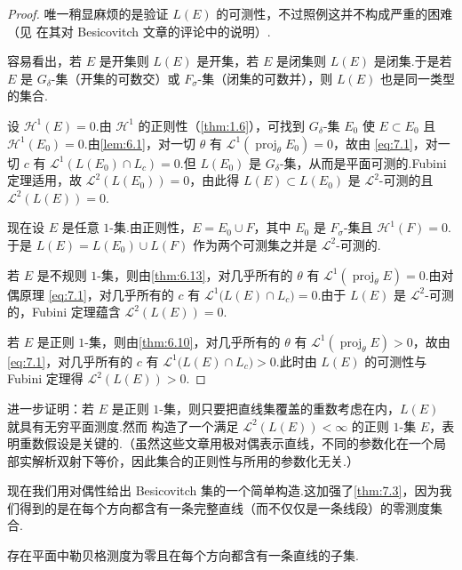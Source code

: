 \begin{proof}
唯一稍显麻烦的是验证 $L(E)$ 的可测性，不过照例这并不构成严重的困难（见 \textcite{croft1965} 在其对 Besicovitch 文章的评论中的说明）.

容易看出，若 $E$ 是开集则 $L(E)$ 是开集，若 $E$ 是闭集则 $L(E)$ 是闭集.于是若 $E$ 是 $G_{\delta}$-集（开集的可数交）或 $F_{\sigma}$-集（闭集的可数并），则 $L(E)$ 也是同一类型的集合.

设 $\mathcal{H}^1(E)=0$.由 $\mathcal{H}^1$ 的正则性（\cref{thm:1.6}），可找到 $G_{\delta}$-集 $E_0$ 使 $E\subset E_0$ 且 $\mathcal{H}^1(E_0)=0$.由\cref{lem:6.1}，对一切 $\theta$ 有 $\mathscr{L}^1(\operatorname{proj}_{\theta}E_0)=0$，故由 \eqref{eq:7.1}，对一切 $c$ 有 $\mathscr{L}^1(L(E_0)\cap L_c)=0$.但 $L(E_0)$ 是 $G_{\delta}$-集，从而是平面可测的.Fubini 定理适用，故 $\mathscr{L}^2(L(E_0))=0$，由此得 $L(E)\subset L(E_0)$ 是 $\mathscr{L}^2$-可测的且 $\mathscr{L}^2(L(E))=0$.

现在设 $E$ 是任意 $1$-集.由正则性，$E=E_0\cup F$，其中 $E_0$ 是 $F_{\sigma}$-集且 $\mathcal{H}^1(F)=0$.于是 $L(E)=L(E_0)\cup L(F)$ 作为两个可测集之并是 $\mathscr{L}^2$-可测的.

若 $E$ 是不规则 $1$-集，则由\cref{thm:6.13}，对几乎所有的 $\theta$ 有 $\mathscr{L}^1(\operatorname{proj}_{\theta}E)=0$.由对偶原理 \eqref{eq:7.1}，对几乎所有的 $c$ 有 $\mathscr{L}^1\bigl(L(E)\cap L_c\bigr)=0$.由于 $L(E)$ 是 $\mathscr{L}^2$-可测的，Fubini 定理蕴含 $\mathscr{L}^2(L(E))=0$.

若 $E$ 是正则 $1$-集，则由\cref{thm:6.10}，对几乎所有的 $\theta$ 有 $\mathscr{L}^1(\operatorname{proj}_{\theta}E)>0$，故由 \eqref{eq:7.1}，对几乎所有的 $c$ 有 $\mathscr{L}^1\bigl(L(E)\cap L_c\bigr)>0$.此时由 $L(E)$ 的可测性与 Fubini 定理得 $\mathscr{L}^2(L(E))>0$.
\end{proof}

\textcite{besicovitch1964a} 进一步证明：若 $E$ 是正则 $1$-集，则只要把直线集覆盖的重数考虑在内，$L(E)$ 就具有无穷平面测度.然而 \textcite{davies1965} 构造了一个满足 $\mathscr{L}^2(L(E))<\infty$ 的正则 $1$-集 $E$，表明重数假设是关键的.（虽然这些文章用极对偶表示直线，不同的参数化在一个局部实解析双射下等价，因此集合的正则性与所用的参数化无关.）

现在我们用对偶性给出 Besicovitch 集的一个简单构造.这加强了\cref{thm:7.3}，因为我们得到的是在每个方向都含有一条完整直线（而不仅仅是一条线段）的零测度集合.

\begin{theorem}\label{thm:7.8}
存在平面中勒贝格测度为零且在每个方向都含有一条直线的子集.
\end{theorem}

